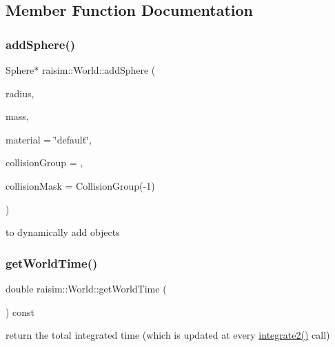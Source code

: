 \subsection{Member Function Documentation}
\mbox{\label{classraisim_1_1World_af28e5c8019ae5efb62c7eed1c6ea06c6}} 
\subsubsection{\texorpdfstring{add\+Sphere()}{addSphere()}}
{\footnotesize\ttfamily Sphere$\ast$ raisim\+::\+World\+::add\+Sphere (\begin{DoxyParamCaption}\item[{double}]{radius,  }\item[{double}]{mass,  }\item[{const std\+::string \&}]{material = {\ttfamily \char`\"{}default\char`\"{}},  }\item[{Collision\+Group}]{collision\+Group = {},  }\item[{Collision\+Group}]{collision\+Mask = {\ttfamily CollisionGroup(-\/1)} }\end{DoxyParamCaption})}

to dynamically add objects \mbox{\label{classraisim_1_1World_af6e0d20c1368ca22a19163dd4deb850c}} 
\subsubsection{\texorpdfstring{get\+World\+Time()}{getWorldTime()}}
{\footnotesize\ttfamily double raisim\+::\+World\+::get\+World\+Time (\begin{DoxyParamCaption}{ }\end{DoxyParamCaption}) const\hspace{0.3cm}{\ttfamily [inline]}}

return the total integrated time (which is updated at every \hyperlink{classraisim_1_1World_a959490c4b2355761ad0623e971522600}{integrate2()} call) \mbox{\label{classraisim_1_1World_a469054d6525c640a978abfaf3da71a33}} 
